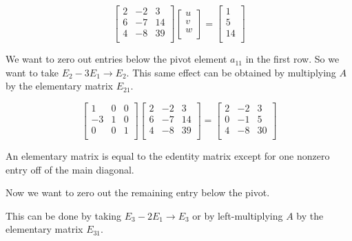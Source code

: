 \documentclass[12pt]{article}
\begin{document}
\begin{equation*}
  \begin{bmatrix}
    2 & -2 & 3\\
    6 & -7 & 14\\
    4 & -8 & 39\\
  \end{bmatrix}
  \begin{bmatrix}
    u\\
    v\\
    w\\
  \end{bmatrix}
  =
  \begin{bmatrix}
    1\\
    5\\
    14\\
  \end{bmatrix}
\end{equation*}

We want to zero out entries below the pivot element $a_{11}$ in the first row.
So we want to take $E_2-3E_1 \to E_2$. This same effect can be obtained by
multiplying $A$ by the elementary matrix $E_{21}$.

\begin{equation*}
  \begin{bmatrix}
    1 & 0 & 0\\
    -3 & 1 & 0\\
    0 & 0 & 1\\
  \end{bmatrix}
  \begin{bmatrix}
    2 & -2 & 3\\
    6 & -7 & 14\\
    4 & -8 & 39\\
  \end{bmatrix}
  =
  \begin{bmatrix}
    2 & -2 & 3\\
    0 & -1 & 5\\
    4 & -8 & 30\\
  \end{bmatrix}
\end{equation*}

An elementary matrix is equal to the edentity matrix except for one nonzero
entry off of the main diagonal.

Now we want to zero out the remaining entry below the pivot.

This can be done by taking $E_3-2E_1 \to E_3$ or by left-multiplying $A$ by the
elementary matrix $E_{31}$.
\end{document}
